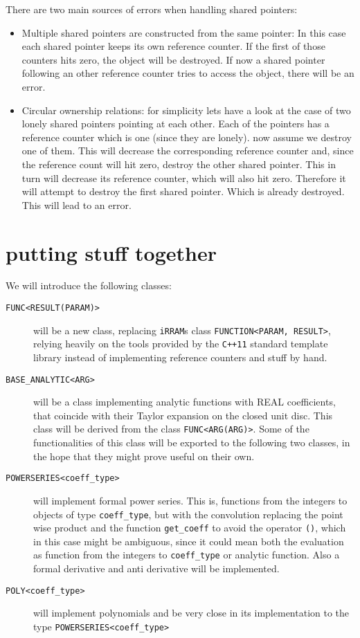 \documentclass{article}
\newcommand{\irrams}{\texttt{iRRAM}s\xspace}
\newcommand{\ccOx}{\texttt{C++11}\xspace}
\newcommand{\ir}[1]{\texttt{#1}\xspace}
\newcommand{\code}[1]{\texttt{#1}\xspace}
\newcommand{\func}[1]{\texttt{#1}\xspace}
\begin{document}
There are two main sources of errors when handling shared pointers:
\begin{itemize}
\item Multiple shared pointers are constructed from the same pointer: In this case each shared pointer keeps its own reference counter. If the first of those counters hits zero, the object will be destroyed. If now a shared pointer following an other reference counter tries to access the object, there will be an error.
\item Circular ownership relations: for simplicity lets have a look at the case of two lonely shared pointers pointing at each other. Each of the pointers has a reference counter which is one (since they are lonely). now assume we destroy one of them. This will decrease the corresponding reference counter and, since the reference count will hit zero, destroy the other shared pointer. This in turn will decrease its reference counter, which will also hit zero. Therefore it will attempt to destroy the first shared pointer. Which is already destroyed. This will lead to an error.
\end{itemize}

\section{putting stuff together}

We will introduce the following classes:
\begin{description}
\item[\func{FUNC<RESULT(PARAM)>}] will be a new class, replacing \irrams class \ir{FUNCTION<PARAM, RESULT>}, relying heavily on the tools provided by the \ccOx standard template library instead of implementing reference counters and stuff by hand.
\item[\func{BASE\_ANALYTIC<ARG>}] will be a class implementing analytic functions with REAL coefficients, that coincide with their Taylor expansion on the closed unit disc. This class will be derived from the class \func{FUNC<ARG(ARG)>}. Some of the functionalities of this class will be exported to the following two classes, in the hope that they might prove useful on their own.
\item[\func{POWERSERIES<coeff\_type>}] will implement formal power series. This is, functions from the integers to objects of type \code{coeff\_type}, but with the convolution replacing the point wise product and the function \code{get\_coeff} to avoid the operator \code{()}, which in this case might be ambiguous, since it could mean both the evaluation as function from the integers to \code{coeff\_type} or analytic function. Also a formal derivative and anti derivative will be implemented.
\item[\func{POLY<coeff\_type>}] will implement polynomials and be very close in its implementation to the type \func{POWERSERIES<coeff\_type>}
\end{description}
\end{document}
